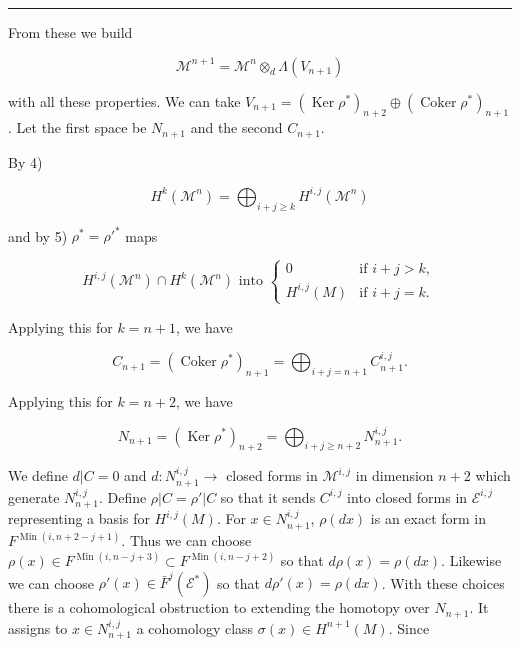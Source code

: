 \documentclass[
  english,
  a3paper,
  a3paper]{extarticle}
\begin{document}
\clearpage



\par

\vspace{0.7mm}\hrule\vspace{1.6mm}

\fontsize{9}{11}\selectfont

From these we build

\[\mathcal{M}^{n+1}=\mathcal{M}^n\otimes_d\Lambda(V_{n+1})\]

with all these properties. We can take
\(V_{n+1}=(\operatorname{Ker}\rho^*)_{n+2}\oplus(\operatorname{Coker}\rho^*)_{n+1}\).
Let the first space be \(N_{n+1}\) and the second \(C_{n+1}\).

By 4)

\[H^k(\mathcal{M}^n)=\bigoplus_{i+j\geq k}H^{i,j}(\mathcal{M}^n)\]

and by 5) \(\rho^*=\rho'^*\) maps

\[H^{i,j}(\mathcal{M}^n)\cap H^k(\mathcal{M}^n)\text{ into }\begin{cases}0 & \text{if }i+j>k,\\ H^{i,j}(M) & \text{if }i+j=k.\end{cases}\]

Applying this for \(k=n+1\), we have

\[C_{n+1}=(\operatorname{Coker}\rho^*)_{n+1}=\bigoplus_{i+j=n+1}C_{n+1}^{i,j}.\]

Applying this for \(k=n+2\), we have

\[N_{n+1}=(\operatorname{Ker}\rho^*)_{n+2}=\bigoplus_{i+j\geq n+2}N_{n+1}^{i,j}.\]

We define \(d|C=0\) and \(d:N_{n+1}^{i,j}\to\) closed forms in
\(\mathcal{M}^{i,j}\) in dimension \(n+2\) which generate
\(N_{n+1}^{i,j}\). Define \(\rho|C=\rho'|C\) so that it sends
\(C^{i,j}\) into closed forms in \(\mathcal{E}^{i,j}\) representing a
basis for \(H^{i,j}(M)\). For \(x\in N_{n+1}^{i,j}\), \(\rho(dx)\) is an
exact form in \(F^{\operatorname{Min}(i,n+2-j+1)}\). Thus we can choose
\(\rho(x)\in F^{\operatorname{Min}(i,n-j+3)}\subset F^{\operatorname{Min}(i,n-j+2)}\)
so that \(d\rho(x)=\rho(dx)\). Likewise we can choose
\(\rho'(x)\in\bar F^j(\mathcal{E}^*)\) so that \(d\rho'(x)=\rho(dx)\).
With these choices there is a cohomological obstruction to extending the
homotopy over \(N_{n+1}\). It assigns to \(x\in N_{n+1}^{i,j}\) a
cohomology class \(\sigma(x)\in H^{n+1}(M)\). Since
\end{document}
